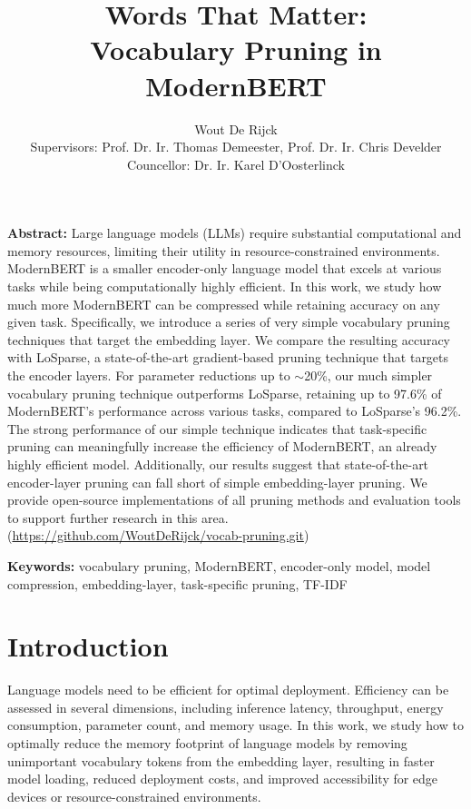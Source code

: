\documentclass[twocolumn]{article}
\title{\vspace{-1.5cm}\huge Words That Matter:\\ Vocabulary Pruning in ModernBERT}
\author{
Wout De Rijck\\[0.5em]
\small{Supervisors:} \normalsize Prof. Dr. Ir. Thomas Demeester, \normalsize Prof. Dr. Ir. Chris Develder\\
\small{Councellor:} \normalsize Dr. Ir. Karel D'Oosterlinck
}
\date{} %
\begin{document}
\maketitle


\textbf{Abstract:} Large language models (LLMs) require substantial computational and memory resources, limiting their utility in resource-constrained environments. 
ModernBERT is a smaller encoder-only language model that excels at various tasks while being computationally highly efficient. 
In this work, we study how much more ModernBERT can be compressed while retaining accuracy on any given task.
Specifically, we introduce a series of very simple vocabulary pruning techniques that target the embedding layer. We compare the resulting accuracy with LoSparse, a state-of-the-art gradient-based pruning technique that targets the encoder layers.
For parameter reductions up to $\sim$20\%, our much simpler vocabulary pruning technique outperforms LoSparse, retaining up to 97.6\% of ModernBERT's performance across various tasks, compared to LoSparse's 96.2\%.
The strong performance of our simple technique indicates that task-specific pruning can meaningfully increase the efficiency of ModernBERT, an already highly efficient model. Additionally, our results suggest that state-of-the-art encoder-layer pruning can fall short of simple embedding-layer pruning.
We provide open-source implementations of all pruning methods and evaluation tools to support further research in this area. (\url{https://github.com/WoutDeRijck/vocab-pruning.git})

\textbf{Keywords:} vocabulary pruning, ModernBERT, encoder-only model, model compression, embedding-layer, task-specific pruning, TF-IDF

\section{Introduction}
Language models need to be efficient for optimal deployment.
Efficiency can be assessed in several dimensions, including inference latency, throughput, energy consumption, parameter count, and memory usage.
In this work, we study how to optimally reduce the memory footprint of language models by removing unimportant vocabulary tokens from the embedding layer, resulting in faster model loading, reduced deployment costs, and improved accessibility for edge devices or resource-constrained environments.
\end{document}
